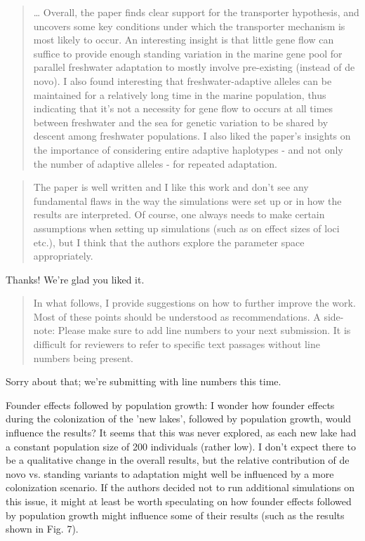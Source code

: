 
\begin{quote}
    \ldots
    Overall, the paper finds clear support for the transporter hypothesis, and
    uncovers some key conditions under which the transporter mechanism is most
    likely to occur. An interesting insight is that little gene flow can suffice to
    provide enough standing variation in the marine gene pool for parallel
    freshwater adaptation to mostly involve pre-existing (instead of de novo). I
    also found interesting that freshwater-adaptive alleles can be maintained for a
    relatively long time in the marine population, thus indicating that it's not a
    necessity for gene flow to occurs at all times between freshwater and the sea
    for genetic variation to be shared by descent among freshwater populations. I
    also liked the paper's insights on the importance of considering entire
    adaptive haplotypes - and not only the number of adaptive alleles - for
    repeated adaptation.  
\end{quote}

\begin{quote}
    The paper is well written and I like this work and don't see any
    fundamental flaws in the way the simulations were set up or in how the results
    are interpreted. Of course, one always needs to make certain assumptions when
    setting up simulations (such as on effect sizes of loci etc.), but I think that
    the authors explore the parameter space appropriately. 
\end{quote}

Thanks! We're glad you liked it.

\begin{quote}
    In what follows, I provide suggestions on how to further improve the work. Most
    of these points should be understood as recommendations. A side-note:
    Please make sure to add line numbers to your next submission. It is
    difficult for reviewers to refer to specific text passages without line
    numbers being present.
\end{quote}

Sorry about that; we're submitting with line numbers this time.

\begin{point}{}
Founder effects followed by population growth: I wonder how founder effects during the colonization of the 'new lakes', followed by population growth, would influence the results? It seems that this was never explored, as each new lake had a constant population size of 200 individuals (rather low). I don't expect there to be a qualitative change in the overall results, but the relative contribution of de novo vs. standing variants to adaptation might well be influenced by a more colonization scenario. If the authors decided not to run additional simulations on this issue, it might at least be worth speculating on how founder effects followed by population growth might influence some of their results (such as the results shown in Fig. 7).
\end{point}

